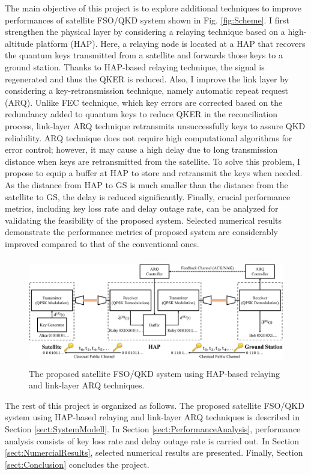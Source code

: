 \documentclass[conference]{IEEEtran}
\begin{document}
The main objective of this project is to explore additional techniques to improve performances of satellite FSO/QKD system shown in Fig. \ref{fig:Scheme}. I first strengthen the physical layer by considering a relaying technique based on a high-altitude platform (HAP). Here, a relaying node is located at a HAP that recovers the quantum keys transmitted from a satellite and forwards those keys to a ground station. Thanks to HAP-based relaying technique, the signal is regenerated and thus the QKER is reduced. Also, I improve the link layer by considering a key-retransmission technique, namely automatic repeat request (ARQ). Unlike FEC technique, which key errors are corrected based on the redundancy added to quantum keys to reduce QKER in the reconciliation process, link-layer ARQ technique retransmits unsuccessfully keys to assure QKD reliability. ARQ technique does not require high computational algorithms for error control; however, it may cause a high delay due to long transmission distance when keys are retransmitted from the satellite. To solve this problem, I propose to equip a buffer at HAP to store and retransmit the keys when needed. As the distance from HAP to GS is much smaller than the distance from the satellite to GS, the delay is reduced significantly. Finally, crucial performance metrics, including key loss rate and delay outage rate, can be analyzed for validating the feasibility of the proposed system. Selected numerical results demonstrate the performance metrics of proposed system are considerably improved compared to that of the conventional ones. 

\begin{figure}[t]
\begin{center}
\includegraphics[width=12.3cm, height=4.7cm]{Figures/Figure2.pdf}
\end{center}
\caption{The proposed satellite FSO/QKD system using HAP-based relaying and link-layer ARQ techniques.}
\label{fig:SystemModel}
\end{figure} 

The rest of this project is organized as follows. The proposed satellite FSO/QKD system using HAP-based relaying and link-layer ARQ techniques is described in Section \ref{sect:SystemModell}. In Section \ref{sect:PerformanceAnalysis}, performance analysis consists of key loss rate and delay outage rate is carried out. In Section \ref{sect:NumercialResults}, selected numerical results are presented. Finally, Section \ref{sect:Conclusion} concludes the project.
\end{document}
